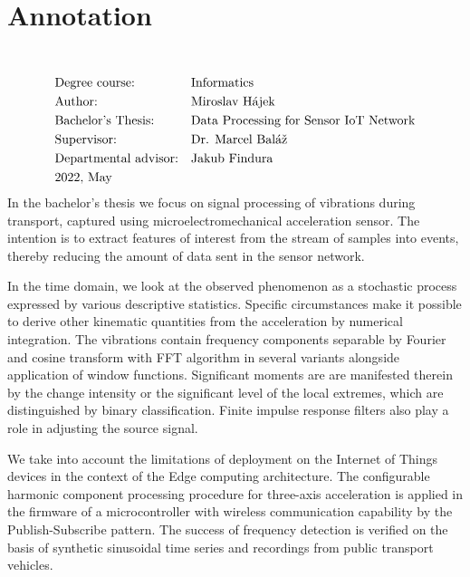 \section*{Annotation}
\UniversityEN \\
\uppercase{\FacultyEN}
\vspace{-8pt}
{\setlength{\mathindent}{0cm}
\begin{align*}
&\text{Degree course:} && \text{\StudyProgrammeEN} \\
&\text{Author:} && \text{\Author} \\
&\text{\ThesisEN:} && \text{\TitleEN} \\
&\text{Supervisor:} && \text{\SupervisorEN} \\
&\text{Departmental advisor:} && \text{\PedagogicalSupervisorEN} \\
&\text{\DateEN}
\end{align*}}
In the bachelor's thesis we focus on signal processing of vibrations during transport, captured using
microelectromechanical acceleration sensor. The intention is to extract features of interest from the stream 
of samples into events, thereby reducing the amount of data sent in the sensor network.

In the time domain, we look at the observed phenomenon as a stochastic process expressed by various descriptive statistics.
Specific circumstances make it possible to derive other kinematic quantities from the acceleration by numerical integration. 
The vibrations contain frequency components separable by Fourier and cosine transform with FFT
algorithm in several variants alongside application of window functions. Significant moments are
are manifested therein by the change intensity or the significant level of the local extremes, which are distinguished by
binary classification. Finite impulse response filters also play a role in adjusting the source signal.

We take into account the limitations of deployment on the Internet of Things devices in the context of the
Edge computing architecture. The configurable harmonic component processing procedure for
three-axis acceleration is applied in the firmware of a microcontroller with wireless communication capability 
by the Publish-Subscribe pattern. The success of frequency detection is verified on the basis of synthetic sinusoidal time series and 
recordings from public transport vehicles.
\emptypage 